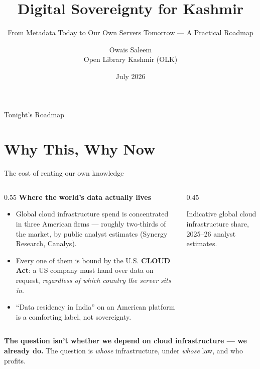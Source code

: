 \documentclass[aspectratio=169,10pt]{beamer}
\title{Digital Sovereignty for Kashmir}
\subtitle{From Metadata Today to Our Own Servers Tomorrow --- A Practical Roadmap}
\author{Owais Saleem \\ \small Open Library Kashmir (OLK)}
\date{July 2026}
\newcommand{\eyebrow}[1]{{\small\color{sovGold}\textbf{#1}}}
\begin{document}
\begin{frame}[plain]
  \titlepage
\end{frame}

\begin{frame}{Tonight's Roadmap}
  \tableofcontents
\end{frame}

\section{Why This, Why Now}

\begin{frame}{The cost of renting our own knowledge}
  \begin{columns}[T]
    \begin{column}{0.55\textwidth}
      \eyebrow{Where the world's data actually lives}
      \vspace{4pt}
      \begin{itemize}
        \item Global cloud infrastructure spend is concentrated in three American firms --- roughly two-thirds of the market, by public analyst estimates (Synergy Research, Canalys).
        \item Every one of them is bound by the U.S. \textbf{CLOUD Act}: a US company must hand over data on request, \emph{regardless of which country the server sits in}.
        \item ``Data residency in India'' on an American platform is a comforting label, not sovereignty.
      \end{itemize}
    \end{column}
    \begin{column}{0.45\textwidth}
      \vspace{-2pt}
      {\scriptsize\color{sovGrey} Indicative global cloud infrastructure share, 2025--26 analyst estimates.}
    \end{column}
  \end{columns}
  \vspace{6pt}
  \begin{takeaway}
    \textbf{The question isn't whether we depend on cloud infrastructure --- we already do.}
    The question is \emph{whose} infrastructure, under \emph{whose} law, and who profits.
  \end{takeaway}
\end{frame}
\end{document}
